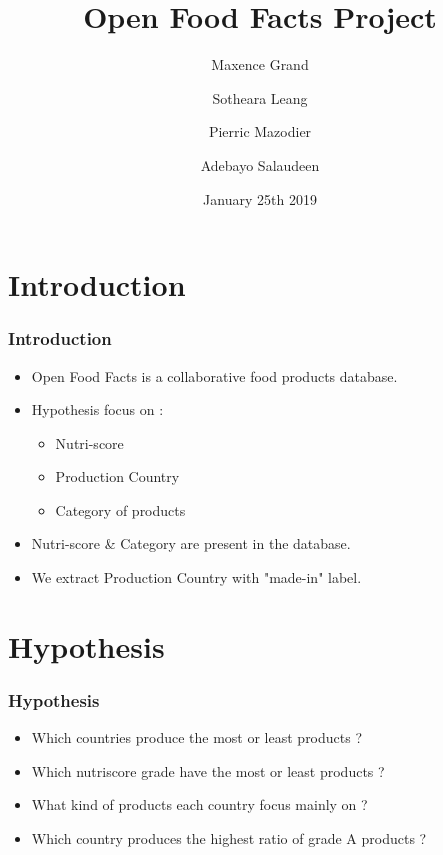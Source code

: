 \documentclass{beamer}
\begin{document}

\title{Open Food Facts Project}
\author{Maxence Grand \and Sotheara Leang \and Pierric Mazodier \and Adebayo Salaudeen } 
\date{January 25th 2019}

\maketitle

\section{Introduction}

\begin{frame}
  \frametitle{Introduction}
  \begin{itemize}
  \item Open Food Facts is a collaborative food products database.\pause
  \item Hypothesis focus on :
    \begin{itemize}[label=-]
      \item Nutri-score
      \item Production Country
      \item Category of products
    \end{itemize}\pause
    \item Nutri-score \& Category are present in the database.\pause
    \item We extract Production Country with "made-in" label.
  \end{itemize}
\end{frame}

\section{Hypothesis}

\begin{frame}
\frametitle{Hypothesis}
\begin{itemize}[label=$\square$]
    \item Which countries produce the most or least products ?\pause 
    \item Which nutriscore grade have the most or least products ?\pause
    \item What kind of products each country focus mainly on ?\pause
    \item Which country produces the highest ratio of grade A products ?  
\end{itemize}
\end{frame}
\end{document}
